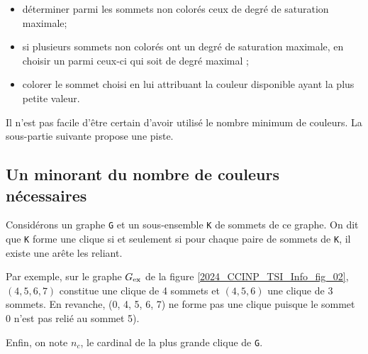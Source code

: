 \ifprof
\begin{corrige}

\end{corrige}
\else
\fi


\begin{itemize}
\item déterminer parmi les sommets non colorés ceux de degré de saturation maximale;
\item si plusieurs sommets non colorés ont un degré de saturation maximale, en choisir un parmi ceux-ci qui soit de degré maximal ;
\item colorer le sommet choisi en lui attribuant la couleur disponible ayant la plus petite valeur.
\end{itemize}
\ifprof
\begin{corrige}

\end{corrige}
\else
\fi

Il n'est pas facile d'être certain d'avoir utilisé le nombre minimum de couleurs. La sous-partie suivante propose une piste.


\subsection{Un minorant du nombre de couleurs nécessaires}
Considérons un graphe \lstinline{G} et un sous-ensemble \lstinline{K} de sommets de ce graphe. On dit que \lstinline{K} forme une clique si et seulement si pour chaque paire de sommets de \lstinline{K}, il existe une arête les reliant.

Par exemple, sur le graphe ${G}_{\text{ex}}$ de la figure \ref{2024_CCINP_TSI_Info_fig_02}, $(4, 5, 6, 7)$ constitue une clique de 4 sommets et $(4, 5, 6)$ une clique de 3 sommets. En revanche, (0, 4, 5, 6, 7) ne forme pas une clique puisque le sommet 0 n'est pas relié au sommet 5).

Enfin, on note $n_c$, le cardinal de la plus grande clique de \lstinline{G}.


\ifprof
\begin{corrige}

\end{corrige}
\else
\fi


